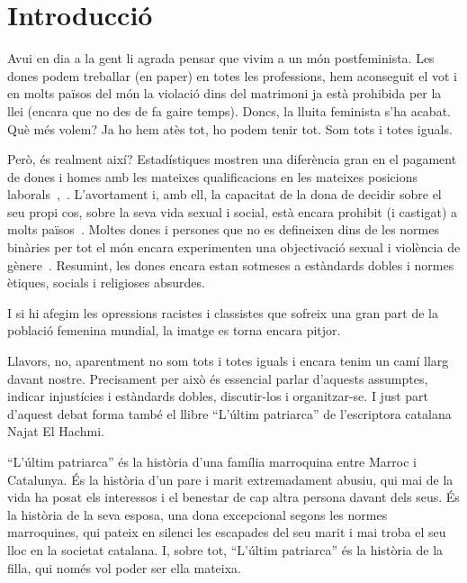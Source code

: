 \section{Introducció}

\begin{comment}
\epigraph{``Every translation is a misrepresentation.''}{Ilan Stavans in~\autocite{Albin2005}}
\epigraph{``'Patriarchy' does not mean 'the rule of men'. It means 'the rule of fathers'--literally, the rule of powerful heads of household over everybody else in society. Men further down the social chain were expected to be content with having power over women in order to make up for their lack of control over the rest of their lives.''}{Laurie Penny~\autocite[69]{Penny2014}}
\end{comment}

Avui en dia a la gent li agrada pensar que vivim a un món postfeminista.
Les dones podem treballar (en paper) en totes les professions, hem aconseguit el vot i en molts països del món la violació dins del matrimoni ja està prohibida per la llei (encara que no des de fa gaire temps).
Doncs, la lluita feminista s'ha acabat.
Què més volem?
Ja ho hem atès tot, ho podem tenir tot.
Som tots i totes iguals.

Però, és realment així?
Estadístiques mostren una diferència gran en el pagament de dones i homes amb les mateixes qualificacions en les mateixes posicions laborals~\autocite{EU2014},~\autocite{MDBGH2012}.
L'avortament i, amb ell, la capacitat de la dona de decidir sobre el seu propi cos, sobre la seva vida sexual i social, està encara prohibit (i castigat) a molts països~\autocite{UN2013}.
Moltes dones i persones que no es defineixen dins de les normes binàries per tot el món encara experimenten una objectivació sexual i violència de gènere~\autocite{WHO2016}.
Resumint, les dones encara estan sotmeses a estàndards dobles i normes ètiques, socials i religioses absurdes.

I si hi afegim les opressions racistes i classistes que sofreix una gran part de la població femenina mundial, la imatge es torna encara pitjor.

Llavors, no, aparentment no som tots i totes iguals i encara tenim un camí llarg davant nostre.
Precisament per això és essencial parlar d'aquests assumptes, indicar injustícies i estàndards dobles, discutir-los i organitzar-se.
I just part d'aquest debat forma també el llibre ``L'últim patriarca'' de l'escriptora catalana Najat El Hachmi.

``L'últim patriarca'' és la història d'una família marroquina entre Marroc i Catalunya.
És la història d'un pare i marit extremadament abusiu, qui mai de la vida ha posat els interessos i el benestar de cap altra persona davant dels seus.
És la història de la seva esposa, una dona excepcional segons les normes marroquines, qui pateix en silenci les escapades del seu marit i mai troba el seu lloc en la societat catalana.
I, sobre tot, ``L'últim patriarca'' és la història de la filla, qui només vol poder ser ella mateixa.

